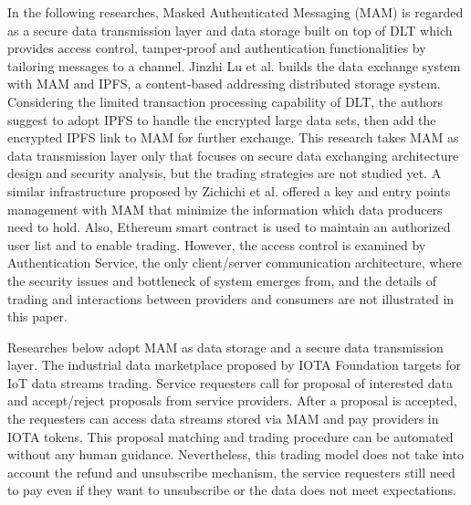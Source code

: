 \documentclass[conference]{IEEEtran}
\begin{document}
In the following researches, Masked Authenticated Messaging (MAM)\cite{MAM} is regarded as a secure data transmission layer and data storage built on top of DLT which provides access control, tamper-proof and authentication functionalities by tailoring messages to a channel. Jinzhi Lu et al.\cite{luDecentralizedDM} builds the data exchange system with MAM and IPFS\cite{IPFS}, a content-based addressing distributed storage system. Considering the limited transaction processing capability of DLT, the authors suggest to adopt IPFS to handle the encrypted large data sets, then add the encrypted IPFS link to MAM for further exchange. This research takes MAM as data transmission layer only that focuses on secure data exchanging architecture design and security analysis, but the trading strategies are not studied yet. A similar infrastructure proposed by Zichichi et al.\cite{SocialGood} offered a key and entry points management with MAM that minimize the information which data producers need to hold. Also, Ethereum smart contract is used to maintain an authorized user list and to enable trading. However, the access control is examined by Authentication Service, the only client/server communication architecture, where the security issues and bottleneck of system emerges from, and the details of trading and interactions between providers and consumers are not illustrated in this paper.

Researches below adopt MAM as data storage and a secure data transmission layer. The industrial data marketplace\cite{IOTAIdustryMarketplace} proposed by IOTA Foundation targets for IoT data streams trading. Service requesters call for proposal of interested data and accept/reject proposals from service providers. After a proposal is accepted, the requesters can access data streams stored via MAM and pay providers in IOTA tokens. This proposal matching and trading procedure can be automated without any human guidance\cite{IOTAIdustryMarketplaceWithoutHuman}. Nevertheless, this trading model does not take into account the refund and unsubscribe mechanism, the service requesters still need to pay even if they want to unsubscribe or the data does not meet expectations.
\end{document}
